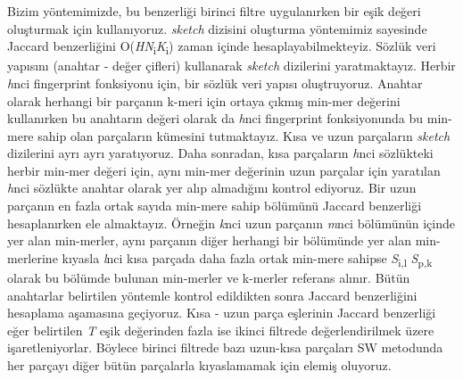 Bizim yöntemimizde, bu benzerliği birinci filtre uygulanırken bir eşik değeri oluşturmak için kullanıyoruz. \textit{sketch} dizisini oluşturma yöntemimiz sayesinde Jaccard benzerliğini O(\textit{H}\textit{N}\textsubscript{i}\textbar\textit{K}\textsubscript{i}) zaman içinde hesaplayabilmekteyiz. Sözlük veri yapısını (anahtar - değer çifleri) kullanarak \textit{sketch} dizilerini yaratmaktayız. Herbir \textit{h}nci fingerprint fonksiyonu için, bir sözlük veri yapısı oluştruyoruz. Anahtar olarak herhangi bir parçanın k-meri için ortaya çıkmış min-mer değerini kullanırken bu anahtarın değeri olarak da \textit{h}nci fingerprint fonksiyonunda bu min-mere sahip olan parçaların kümesini tutmaktayız. Kısa ve uzun parçaların \textit{sketch} dizilerini ayrı ayrı yaratıyoruz. Daha sonradan, kısa parçaların \textit{h}nci sözlükteki herbir min-mer değeri için, aynı min-mer değerinin uzun parçalar için yaratılan \textit{h}nci sözlükte anahtar olarak yer alıp almadığını kontrol ediyoruz. Bir uzun parçanın en fazla ortak sayıda min-mere sahip bölümünü Jaccard benzerliği hesaplanırken ele almaktayız. Örneğin \textit{k}nci uzun parçanın \textit{m}nci bölümünün içinde yer alan min-merler, aynı parçanın diğer herhangi bir bölümünde yer alan min-merlerine kıyasla \textit{l}nci kısa parçada daha fazla ortak min-mere sahipse \textit{S}\textsubscript{i,l} \textit{S}\textsubscript{p,k} olarak bu bölümde bulunan min-merler ve k-merler referans alınır. Bütün anahtarlar belirtilen yöntemle kontrol edildikten sonra Jaccard benzerliğini hesaplama aşamasına geçiyoruz. Kısa - uzun parça eşlerinin Jaccard benzerliği eğer belirtilen \textit{T} eşik değerinden fazla ise ikinci filtrede değerlendirilmek üzere işaretleniyorlar. Böylece birinci filtrede bazı uzun-kısa parçaları SW metodunda her parçayı diğer bütün parçalarla kıyaslamamak için elemiş oluyoruz.
